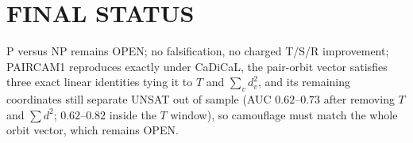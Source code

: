 \documentclass[11pt]{article}
\begin{document}
\section*{FINAL STATUS}
P versus NP remains OPEN; no falsification, no charged T/S/R improvement; PAIRCAM1 reproduces exactly under CaDiCaL, the pair-orbit vector satisfies three exact linear identities tying it to $T$ and $\sum_v d_v^2$, and its remaining coordinates still separate UNSAT out of sample (AUC $0.62$--$0.73$ after removing $T$ and $\sum d^2$; $0.62$--$0.82$ inside the $T$ window), so camouflage must match the whole orbit vector, which remains OPEN.
\end{document}
